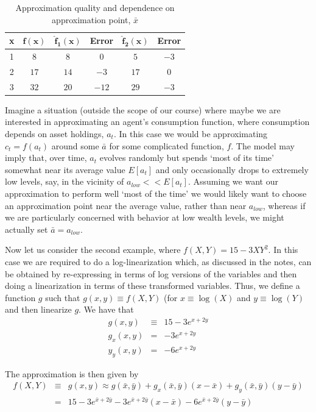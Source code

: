 \documentclass[authoryear,11pt]{elsarticle}
\begin{document}
\begin{table}[!htb]
\centering
\begin{tabular}{ c | c | c | c | c | c}
\textbf{x} 	& $\mathbf{f(x)}$ 	& $\mathbf{\hat{f}_{1}(x)}$ 	& \textbf{Error} 	& $\mathbf{\hat{f}_{2}(x)}$ 	& \textbf{Error}	\\ \hline \hline
  1			& $8$				& $8$						& $0$			& $5$						& $-3$			\\
  2			& $17$				& $14$						& $-3$			& $17$						& $0$			\\
  3			& $32$				& $20$						& $-12$			& $29$						& $-3$			\\ \hline \hline
\end{tabular}
\caption{Approximation quality and dependence on approximation point, $\bar{x}$}
\label{tab:approx_error}
\end{table}

Imagine a situation (outside the scope of our course) where maybe we are interested in approximating an agent's consumption function, where consumption depends on asset holdings, $a_{t}$. In this case we would be approximating $c_{t} = f(a_{t})$ around some $\bar{a}$ for some complicated function, $f$. The model may imply that, over time, $a_{t}$ evolves randomly but spends `most of its time' somewhat near its average value $E[a_{t}]$ and only occasionally drops to extremely low levels, say, in the vicinity of $a_{low}<<E[a_{t}]$. Assuming we want our approximation to perform well `most of the time' we would likely want to choose an approximation point near the average value, rather than near $a_{low}$, whereas if we are particularly concerned with behavior at low wealth levels, we might actually set $\bar{a}=a_{low}$.

Now let us consider the second example, where $f(X,Y) = 15 - 3 XY^{2}$. In this case we are required to do a log-linearization which, as discussed in the notes, can be obtained by re-expressing in terms of log versions of the variables and then doing a linearization in terms of these transformed variables. Thus, we define a function $g$ such that $g(x,y) \equiv f(X,Y)$ (for $x\equiv \log{(X)}$ and $y\equiv \log{(Y)}$ and then linearize $g$. We have that
\begin{eqnarray*}
g(x,y)		&\equiv& 15 - 3e^{x+2y}	\\
g_{x}(x,y)	&=& -3e^{x+2y}			\\
y_{y}(x,y)	&=& -6e^{x+2y}
\end{eqnarray*}

The approximation is then given by
\begin{eqnarray*}
f(X,Y) 	&\equiv& 	g(x,y) \approx g(\bar{x}, \bar{y}) + g_{x}(\bar{x},\bar{y})(x-\bar{x}) + g_{y}(\bar{x},\bar{y})(y-\bar{y}) \\
		&=&		15 - 3e^{\bar{x}+2\bar{y}}  -3e^{\bar{x}+2\bar{y}}(x-\bar{x}) - 6e^{\bar{x}+2\bar{y}}(y-\bar{y})
\end{eqnarray*}
\end{document}
